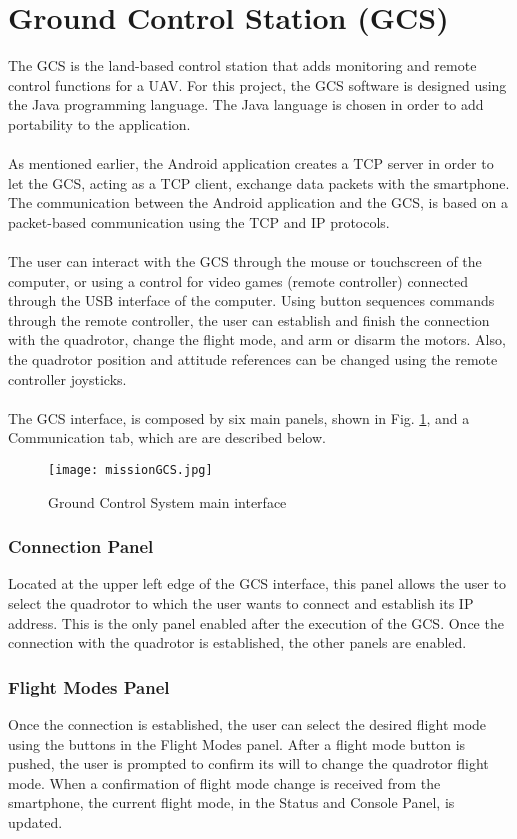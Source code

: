 \section{Ground Control Station (GCS)}\label{sec:gcs}
The GCS is the land-based control station that adds monitoring and remote control functions for a UAV. For this project, the GCS software is designed using the Java programming language. The Java language is chosen in order to add portability to the application.
\\\\
As mentioned earlier, the Android application creates a TCP server in order to let the GCS, acting as a TCP client, exchange data packets with the smartphone. The communication between the Android application and the GCS, is based on a packet-based communication using the TCP and IP protocols. 
\\\\
The user can interact with the GCS through the mouse or touchscreen of the computer, or using a control for video games (remote controller) connected through the USB interface of the computer. Using button sequences commands through the remote controller, the user can establish and finish the connection with the quadrotor, change the flight mode, and arm or disarm the motors. Also, the quadrotor position and attitude references can be changed using the remote controller joysticks.
\\\\
The GCS interface, is composed by six main panels, shown in Fig. \ref{fig:missionGCS}, and a Communication tab, which are are described below.
\begin{figure}[h]
\begin{center}
\texttt{[image: missionGCS.jpg]}  
\caption{Ground Control System main interface} 
\label{fig:missionGCS}
\end{center}
\end{figure}

\subsubsection*{Connection Panel}
Located at the upper left edge of the GCS interface, this panel allows the user to select the quadrotor to which the user wants to connect and establish its IP address. This is the only panel enabled after the execution of the GCS. Once the connection with the quadrotor is established, the other panels are enabled.
\subsubsection*{Flight Modes Panel}
Once the connection is established, the user can select the desired flight mode using the buttons in the Flight Modes panel. After a flight mode button is pushed, the user is prompted to confirm its will to change the quadrotor flight mode. When a confirmation of flight mode change is received from the smartphone, the current flight mode, in the Status and Console Panel, is updated.
